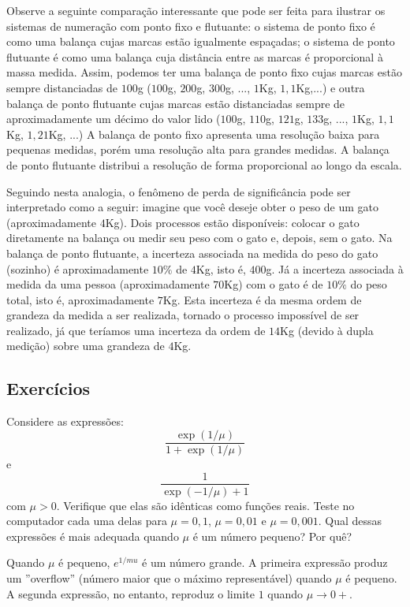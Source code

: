 \begin{ex} Observe a seguinte comparação interessante que pode ser feita para ilustrar os sistemas de numeração com ponto fixo e flutuante: o sistema de ponto fixo é como uma balança cujas marcas estão igualmente espaçadas; o sistema de ponto flutuante é como uma balança cuja distância entre as marcas é proporcional à massa medida. Assim, podemos ter uma balança de ponto fixo cujas marcas estão sempre distanciadas de $100$g ($100$g, $200$g, $300$g, ..., $1$Kg, $1,1$Kg,...) e outra balança de ponto flutuante cujas marcas estão distanciadas sempre de aproximadamente um décimo do valor lido ($100$g, $110$g, $121$g, $133$g, ..., $1$Kg, $1,1$Kg, $1,21$Kg, ...) A balança de ponto fixo apresenta uma resolução baixa para pequenas medidas, porém uma resolução alta para grandes medidas. A balança de ponto flutuante distribui a resolução de forma proporcional ao longo da escala.    

Seguindo nesta analogia, o fenômeno de perda de significância pode ser interpretado como a seguir: imagine que você deseje obter o peso de um gato (aproximadamente $4$Kg). Dois processos estão disponíveis: colocar o gato diretamente na balança ou medir seu peso com o gato e, depois, sem o gato. Na balança de ponto flutuante, a incerteza associada na medida do peso do gato (sozinho) é aproximadamente $10\%$ de $4$Kg, isto é, $400$g. Já a incerteza associada à medida da uma pessoa (aproximadamente $70$Kg) com o gato é de $10\%$ do peso total, isto é, aproximadamente $7$Kg. Esta incerteza é da mesma ordem de grandeza da medida a ser realizada, tornado o processo impossível de ser realizado, já que teríamos uma incerteza da ordem de $14$Kg (devido à dupla medição) sobre uma grandeza de $4$Kg.    
\end{ex}

\subsection{Exercícios}

\begin{Exercise} Considere as expressões:
  \begin{equation*}
    \frac{\exp(1/\mu)}{1+\exp(1/\mu)}  
  \end{equation*}
e
\begin{equation*}
  \frac{1}{\exp(-1/\mu)+1}
\end{equation*}
com $\mu>0$. Verifique que elas são idênticas como funções reais. Teste no computador cada uma delas para $\mu=0,1$, $\mu=0,01$ e $\mu=0,001$. Qual dessas expressões é mais adequada quando $\mu$ é um número pequeno? Por quê?
\end{Exercise}
\begin{Answer}
  \begin{tiny}
  Quando $\mu$ é pequeno, $e^{1/mu}$ é um número grande. A primeira expressão produz um ''overflow'' (número maior que o máximo representável) quando $\mu$ é pequeno. A segunda expressão, no entanto, reproduz o limite $1$ quando $\mu\to 0+$.
  \end{tiny}
\end{Answer}

